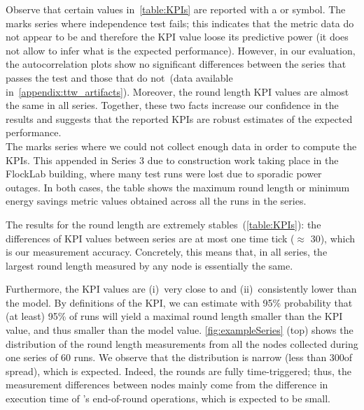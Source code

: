 
\begin{remark}
  Observe that certain values in~\cref{table:KPIs} are reported with a {} or {} symbol.
  The {} marks series where \triscale independence test fails; this indicates that the metric data do not appear to be \iid and therefore the KPI value loose its predictive power (\ie it does not allow to infer what is the expected performance).
  However, in our evaluation, the autocorrelation plots show no significant differences between the series that passes the test and those that do not~(data available in~\cref{appendix:ttw_artifacts}).
  Moreover, the round length KPI values are almost the same in all series.
  Together, these two facts increase our confidence in the results and suggests that the reported KPIs are robust estimates of the expected performance.\\
  The {} marks series where we could not collect enough data in order to compute the KPIs. This appended in Series 3 due to construction work taking place in the FlockLab building, where many test runs were lost due to sporadic power outages.
  In both cases, the table shows the maximum round length or minimum energy savings metric values obtained across all the runs in the series.
\end{remark}

The results for the round length are extremely stables~(\cref{table:KPIs}):
the differences of KPI values between series are at most one time tick ($\approx$ 30\us), which is our measurement accuracy.
Concretely, this means that, in all series, the largest round length measured by any node is essentially the same.

Furthermore, the KPI values are (i)~very close to and (ii)~consistently lower than the model. By definitions of the KPI, we can estimate with 95\% probability that (at least) 95\% of runs will yield a maximal round length smaller than the KPI value, and thus smaller than the model value.
\cref{fig:exampleSeries} (top) shows the distribution of the round length measurements from all the nodes collected during one series of 60 runs. We observe that the distribution is narrow (less than 300\us of spread), which is expected. Indeed, the \TTnet rounds are fully time-triggered; thus, the measurement differences between nodes mainly come from the difference in execution time of \baloo's end-of-round operations, which is expected to be small.

